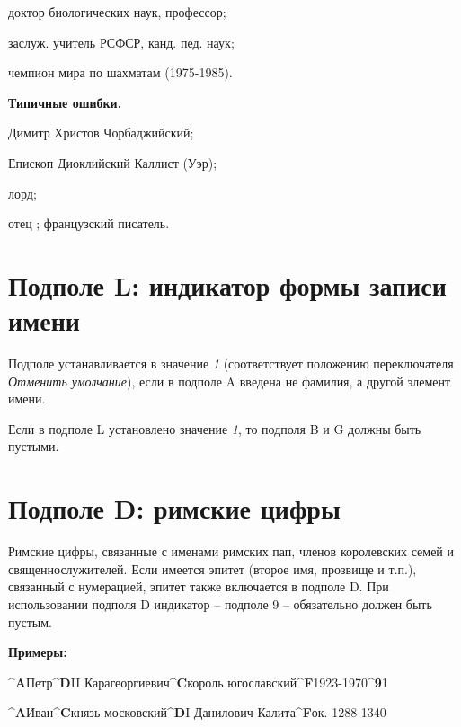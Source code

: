 \begin{cutelist}
    \item доктор биологических наук, профессор;
    \item заслуж. учитель РСФСР, канд. пед. наук;
    \item чемпион мира по шахматам (1975-1985).
\end{cutelist}

\textbf{Типичные ошибки.}

\begin{cutelist}
    \item Димитр Христов Чорбаджийский;
    \item Епископ Диоклийский Каллист (Уэр);
    \item лорд;
    \item отец ; французский писатель.
\end{cutelist}


\section{Подполе L: индикатор формы записи имени}

Подполе устанавливается в значение \emph{1} (соответствует положению переключателя \emph{Отменить умолчание}), если в подполе A введена не фамилия, а другой элемент имени.

Если в подполе L установлено значение \emph{1}, то подполя B и G должны быть пустыми.

\section{Подполе D: римские цифры}

Римские цифры, связанные с именами римских пап, членов королевских семей и священнослужителей. Если имеется эпитет (второе имя, прозвище и т.п.), связанный с нумерацией, эпитет также включается в подполе D. При использовании подполя D индикатор -- подполе 9 -- обязательно должен быть пустым.

\textbf{Примеры:}

\begin{cutelist}
    \item \textbf{\^{}A}Петр\textbf{\^{}D}II Карагеоргиевич\textbf{\^{}C}король югославский\textbf{\^{}F}1923-1970\textbf{\^{}9}1
    \item \textbf{\^{}A}Иван\textbf{\^{}C}князь московский\textbf{\^{}D}I Данилович Калита\textbf{\^{}F}ок. 1288-1340
\end{cutelist}

